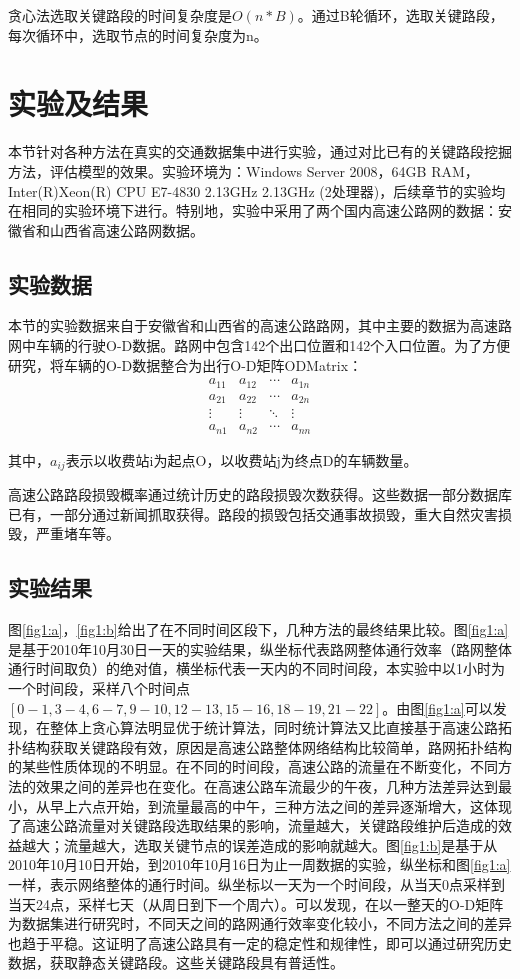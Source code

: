 			贪心法选取关键路段的时间复杂度是$O(n*B)$。通过B轮循环，选取关键路段，每次循环中，选取节点的时间复杂度为n。
		\section{实验及结果}
		本节针对各种方法在真实的交通数据集中进行实验，通过对比已有的关键路段挖掘方法，评估模型的效果。实验环境为：Windows Server 2008，64GB RAM，Inter(R)Xeon(R) CPU E7-4830 2.13GHz 2.13GHz (2处理器)，后续章节的实验均在相同的实验环境下进行。特别地，实验中采用了两个国内高速公路网的数据：安徽省和山西省高速公路网数据。
			\subsection{实验数据}
				本节的实验数据来自于安徽省和山西省的高速公路路网，其中主要的数据为高速路网中车辆的行驶O-D数据。路网中包含142个出口位置和142个入口位置。为了方便研究，将车辆的O-D数据整合为出行O-D矩阵ODMatrix：
				\[\begin{array}{*{20}{c}}
				{{a_{11}}}&{{a_{12}}}& \cdots &{{a_{1n}}}\\
				{{a_{21}}}&{{a_{22}}}& \cdots &{{a_{2n}}}\\
				 \vdots & \vdots & \ddots & \vdots \\
				{{a_{n1}}}&{{a_{n2}}}& \cdots &{{a_{nn}}}
				\end{array}\]

				其中，$a_{ij}$表示以收费站i为起点O，以收费站j为终点D的车辆数量。

				高速公路路段损毁概率通过统计历史的路段损毁次数获得。这些数据一部分数据库已有，一部分通过新闻抓取获得。路段的损毁包括交通事故损毁，重大自然灾害损毁，严重堵车等。

			\subsection{实验结果}
				图\ref{fig1:a}，\ref{fig1:b}给出了在不同时间区段下，几种方法的最终结果比较。图\ref{fig1:a}是基于2010年10月30日一天的实验结果，纵坐标代表路网整体通行效率（路网整体通行时间取负）的绝对值，横坐标代表一天内的不同时间段，本实验中以1小时为一个时间段，采样八个时间点$[0-1,3-4,6-7,9-10,12-13,15-16,18-19,21-22]$。由图\ref{fig1:a}可以发现，在整体上贪心算法明显优于统计算法，同时统计算法又比直接基于高速公路拓扑结构获取关键路段有效，原因是高速公路整体网络结构比较简单，路网拓扑结构的某些性质体现的不明显。在不同的时间段，高速公路的流量在不断变化，不同方法的效果之间的差异也在变化。在高速公路车流最少的午夜，几种方法差异达到最小，从早上六点开始，到流量最高的中午，三种方法之间的差异逐渐增大，这体现了高速公路流量对关键路段选取结果的影响，流量越大，关键路段维护后造成的效益越大；流量越大，选取关键节点的误差造成的影响就越大。图\ref{fig1:b}是基于从2010年10月10日开始，到2010年10月16日为止一周数据的实验，纵坐标和图\ref{fig1:a}一样，表示网络整体的通行时间。纵坐标以一天为一个时间段，从当天0点采样到当天24点，采样七天（从周日到下一个周六）。可以发现，在以一整天的O-D矩阵为数据集进行研究时，不同天之间的路网通行效率变化较小，不同方法之间的差异也趋于平稳。这证明了高速公路具有一定的稳定性和规律性，即可以通过研究历史数据，获取静态关键路段。这些关键路段具有普适性。



